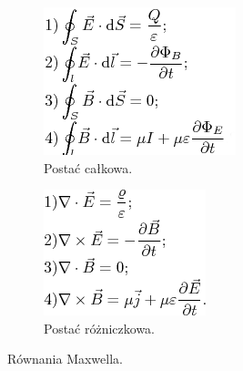 \begin{figure} [H]
	\centering
	\begin{subfigure}{.49\textwidth}
		\centering
		\includegraphics[width=1.0\linewidth]{generalIssues/Figures/maxwell1.png}
		\caption{Postać całkowa.}
		\label{n1}
	\end{subfigure}
	\begin{subfigure}{.49\textwidth}
		\centering
		\includegraphics[width=1.0\linewidth]{generalIssues/Figures/maxwell2.png}
		\caption{Postać różniczkowa.}
		\label{r1}
	\end{subfigure}
	\caption{Równania Maxwella.}
	\label{maxwell}
\end{figure}


